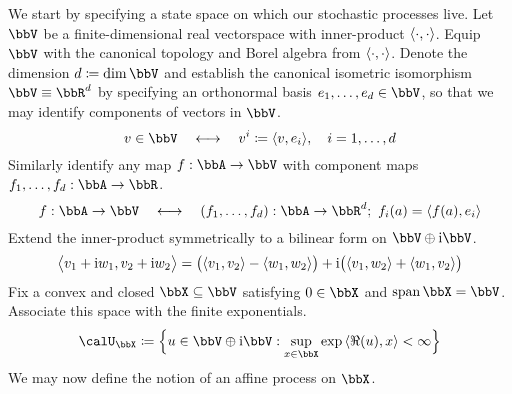 We start by specifying a state space on which our stochastic processes live.
Let $\vecSpace$ be a finite-dimensional real vectorspace with inner-product ${\langle \cdot , \cdot \rangle}$.
Equip $\vecSpace$ with the canonical topology and Borel algebra from ${\langle \cdot , \cdot \rangle}$.
Denote the dimension $d \defeq \dim\vecSpace$ and establish the canonical isometric isomorphism $\vecSpace \equiv \bbR^d$ by specifying an orthonormal basis $\basisVec_1, \ldots, \basisVec_d \in \vecSpace$, so that we may identify components of vectors in $\vecSpace$.
\begin{equation*}
  \vecVar \in \vecSpace \quad\longleftrightarrow\quad \vecVar^i \defeq \prj{\vecVar}{\basisVec_i}, \quad i = 1, \ldots, d
\end{equation*}
Similarly identify any map $f: \bbA \rightarrow \vecSpace$ with component maps $f_1, \ldots, f_d: \bbA \rightarrow \bbR$.
\begin{equation*}
  f: \bbA \rightarrow \vecSpace \quad\longleftrightarrow\quad (f_1,\ldots, f_d): \bbA \rightarrow \bbR^d; ~ f_i(a) = \prj{f(a)}{\basisVec_i}
\end{equation*}
Extend the inner-product symmetrically to a bilinear form on $\vecSpace\oplus\im\vecSpace$.
\begin{equation*}
  {\big\langle v_1+{\rm i}w_1 , v_2 + {\rm i}w_2 \big\rangle} = \big({\langle v_1 , v_2 \rangle} - {\langle w_1 , w_2 \rangle}\big) + {\rm i}\big({\langle v_1 , w_2 \rangle} + {\langle w_1 , v_2 \rangle}\big)
\end{equation*}
Fix a convex and closed $\stateSpace \subseteq \vecSpace$ satisfying $0 \in \stateSpace$ and $\operatorname{span}\stateSpace = \vecSpace$.
Associate this space with the finite exponentials.
\begin{equation*}
  \boundedSpace \defeq \Big\{ \momentVar \in \vecSpace \oplus \im\vecSpace : \sup_{\stateVar \in \stateSpace} \exp\prj{\Re(\momentVar)}{\stateVar} < \infty \Big\}
\end{equation*}
We may now define the notion of an affine process on $\stateSpace$.





